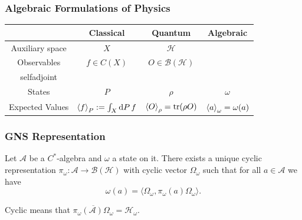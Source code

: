 \documentclass{beamer}
\begin{document}
\begin{frame}
	
	\frametitle{Algebraic Formulations of Physics}	
	
	\begin{table}
	\begin{tabular}{|c|c|c|c|}
	\hline
	& Classical & Quantum & Algebraic\\
	\hline
	Auxiliary space & $X$ & $\mathcal{H}$ & \\
	\hline
	Observables & $f\in C(X)$ & $O\in\mathcal{B}(\mathcal{H})$ & \makecell{$a\in\mathcal{A}$ \\ selfadjoint}\\
	\hline
	States & $P$ & $\rho$ & $\omega$\\
	\hline
	Expected Values & $\ev{f}_P:=\int_X\dd{P}f$ & $\ev{O}_\rho=\tr(\rho O)$ & $\ev{a}_\omega=\omega(a)$\\
	\hline
	\end{tabular}
	\end{table}
	
\end{frame}

\begin{frame}

	\frametitle{GNS Representation}
	
	\begin{theorem}
		Let $\mathcal{A}$ be a $C^*$-algebra and $\omega$ a state on it. There exists a unique cyclic representation $\pi_\omega:\mathcal{A}\rightarrow\mathcal{B}(\mathcal{H})$ with cyclic vector $\Omega_\omega$ such that for all $a\in\mathcal{A}$ we have
		\begin{equation}
			\omega(a)=\langle\Omega_\omega,\pi_\omega(a)\Omega_\omega\rangle.
		\end{equation}
\cite{Bratteli1987}
	\end{theorem}
	
	Cyclic means that $\overline{\pi_\omega(\mathcal{A})\Omega_\omega}=\mathcal{H}_\omega$.

\end{frame}
\end{document}
